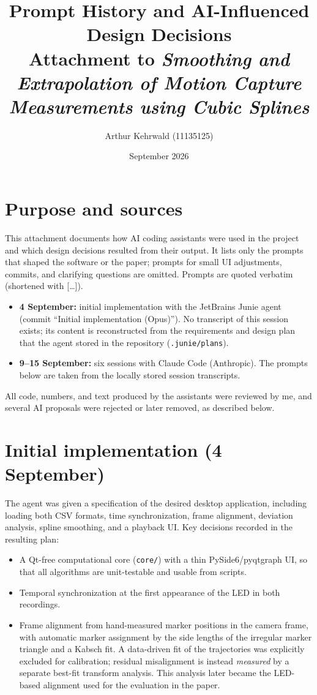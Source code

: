 \documentclass[11pt,a4paper]{article}
\title{Prompt History and AI-Influenced Design Decisions\\[4pt]
  \large Attachment to \emph{Smoothing and Extrapolation of Motion Capture Measurements using Cubic Splines}}
\author{Arthur Kehrwald (11135125)}
\date{September 2026}
\begin{document}
\maketitle

\section*{Purpose and sources}

This attachment documents how AI coding assistants were used in the project and which design decisions resulted from their output.
It lists only the prompts that shaped the software or the paper; prompts for small UI adjustments, commits, and clarifying questions are omitted.
Prompts are quoted verbatim (shortened with [\dots]).

\begin{itemize}
  \item \textbf{4 September:} initial implementation with the JetBrains Junie agent (commit ``Initial implementation (Opus)'').
    No transcript of this session exists; its content is reconstructed from the requirements and design plan that the agent stored in the repository (\texttt{.junie/plans}).
  \item \textbf{9--15 September:} six sessions with Claude Code (Anthropic).
    The prompts below are taken from the locally stored session transcripts.
\end{itemize}

All code, numbers, and text produced by the assistants were reviewed by me, and several AI proposals were rejected or later removed, as described below.

\section{Initial implementation (4 September)}

The agent was given a specification of the desired desktop application, including loading both CSV formats, time synchronization, frame alignment, deviation analysis, spline smoothing, and a playback UI.
Key decisions recorded in the resulting plan:
\begin{itemize}
  \item A Qt-free computational core (\texttt{core/}) with a thin PySide6/pyqtgraph UI, so that all algorithms are unit-testable and usable from scripts.
  \item Temporal synchronization at the first appearance of the LED in both recordings.
  \item Frame alignment from hand-measured marker positions in the camera frame, with automatic marker assignment by the side lengths of the irregular marker triangle and a Kabsch fit.
    A data-driven fit of the trajectories was explicitly excluded for calibration; residual misalignment is instead \emph{measured} by a separate best-fit transform analysis.
    This analysis later became the LED-based alignment used for the evaluation in the paper.
\end{itemize}
\end{document}
